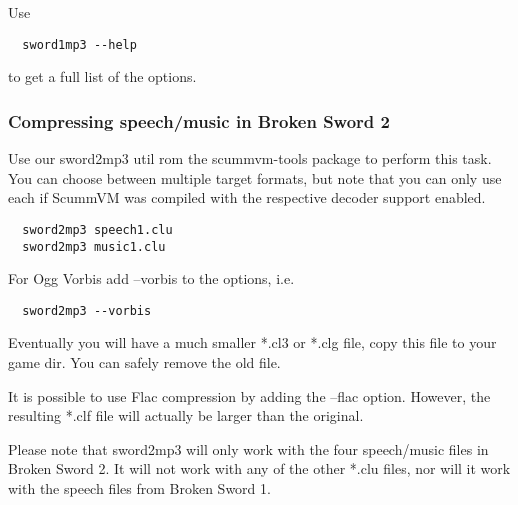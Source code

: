 Use 
\begin{verbatim}
  sword1mp3 --help
\end{verbatim}
%
to get a full list of the options.

\subsubsection{Compressing speech/music in Broken Sword 2}

Use our sword2mp3 util rom the scummvm-tools package to perform this task.
You can choose between multiple target formats, but note  that you can only use
each if ScummVM was compiled with the respective decoder support enabled.

\begin{verbatim}
  sword2mp3 speech1.clu
  sword2mp3 music1.clu
\end{verbatim}
%
For Ogg Vorbis add --vorbis to the options, i.e.
\begin{verbatim}
  sword2mp3 --vorbis
\end{verbatim}
%
Eventually you will have a much smaller *.cl3 or *.clg file, copy this file to
your game dir. You can safely remove the old file.

It is possible to use Flac compression by adding the --flac option. However,
the resulting *.clf file will actually be larger than the original.

Please note that sword2mp3 will only work with the four speech/music files in
Broken Sword 2. It will not work with any of the other *.clu files, nor will it
work with the speech files from Broken Sword 1.
